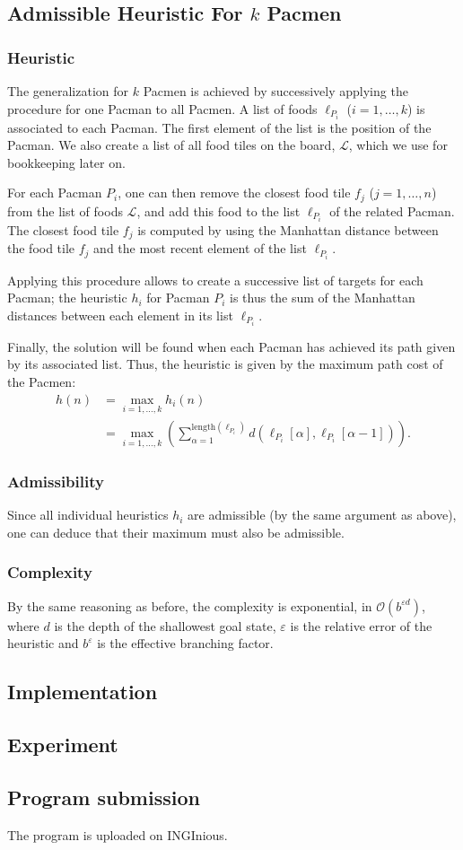 \documentclass[journal]{IEEEtran}
\begin{document}
\subsection{Admissible Heuristic For \(k\) Pacmen}
\subsubsection{Heuristic}
The generalization for $k$ Pacmen is achieved by successively applying the procedure for one Pacman to all Pacmen.
A list of foods $\ell_{P_i}$ ($i=1,\dots,k$) is associated to each Pacman.
The first element of the list is the position of the Pacman.
We also create a list of all food tiles on the board, \(\mathscr{L}\), which we use for bookkeeping later on.

For each Pacman $P_i$, one can then remove the closest food tile $f_j$ ($j=1,\dots,n$) from the list of foods \(\mathscr{L}\), and add this food to the list $\ell_{P_i}$ of the related Pacman.
The closest food tile $f_j$ is computed by using the Manhattan distance between the food tile $f_j$ and the most recent element of the list $\ell_{P_i}$.

Applying this procedure allows to create a successive list of targets for each Pacman; the heuristic \(h_i\) for Pacman $P_i$ is thus the sum of the Manhattan distances between each element in its list $\ell_{P_i}$.

Finally, the solution will be found when each Pacman has achieved its path given by its associated list.
Thus, the heuristic is given by the maximum path cost of the Pacmen:
\begin{align*}
 h(n) &= \max_{i = 1,\ldots,k} h_i(n) \\
 &= \max_{i=1,\ldots, k} \left(\sum_{\alpha=1}^{\mathrm{length}(\ell_{P_i})} d\left(\ell_{P_i}[\alpha],\ell_{P_i}[\alpha-1]\right)\right).
\end{align*}

\subsubsection{Admissibility}
Since all individual heuristics \(h_i\) are admissible (by the same argument as above), one can deduce that their maximum must also be admissible.

\subsubsection{Complexity}
By the same reasoning as before, the complexity is exponential, in \(\mathcal{O}(b^{\varepsilon d})\), where \(d\) is the depth of the shallowest goal state, \(\varepsilon\) is the relative error of the heuristic and \(b^\varepsilon\) is the effective branching factor.

\subsection{Implementation}



\subsection{Experiment}



\subsection{Program submission}

The program is uploaded on INGInious.
\end{document}
